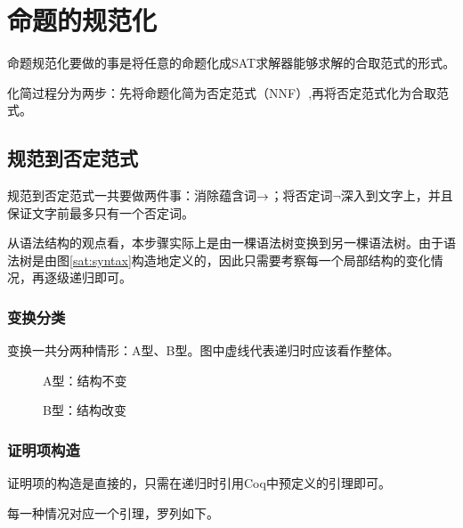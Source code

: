 \section{命题的规范化}
命题规范化要做的事是将任意的命题化成SAT求解器能够求解的合取范式的形式。

化简过程分为两步：先将命题化简为否定范式（NNF）,再将否定范式化为合取范式。

\subsection{规范到否定范式}
规范到否定范式一共要做两件事：消除蕴含词$\rightarrow$；将否定词$\lnot$深入到文字上，并且保证文字前最多只有一个否定词。

从语法结构的观点看，本步骤实际上是由一棵语法树变换到另一棵语法树。由于语法树是由图\ref{sat:syntax}构造地定义的，因此只需要考察每一个局部结构的变化情况，再逐级递归即可。

\subsubsection{变换分类}
变换一共分两种情形：A型、B型。图中虚线代表递归时应该看作整体。
\begin{figure}[!h]
\centering
{}
\caption{A型：结构不变}
\end{figure}

\begin{figure}[!h]
\centering
{}
\caption{B型：结构改变}
\end{figure}

\subsubsection{证明项构造}
证明项的构造是直接的，只需在递归时引用Coq中预定义的引理即可。

每一种情况对应一个引理，罗列如下。

